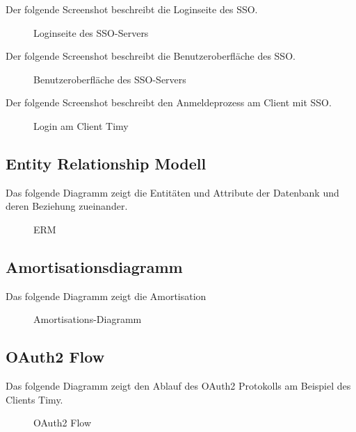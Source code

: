 Der folgende Screenshot beschreibt die Loginseite des \acs{SSO}.
\begin{figure}[htb]
\centering
{}
\caption{Loginseite des SSO-Servers}
\end{figure}
\clearpage

Der folgende Screenshot beschreibt die Benutzeroberfläche des \acs{SSO}.
\begin{figure}[htb]
\centering
{}
\caption{Benutzeroberfläche des SSO-Servers}
\end{figure}
\clearpage

Der folgende Screenshot beschreibt  den Anmeldeprozess am Client mit \acs{SSO}.
\begin{figure}[htb]
\centering
{}
\caption{Login am Client Timy}
\end{figure}
\clearpage

\subsection{Entity Relationship Modell}
\label{app:ERM}
Das folgende Diagramm zeigt die Entitäten und Attribute der Datenbank und deren Beziehung zueinander.
\begin{figure}[htb]
\centering
{}
\caption{ERM}
\end{figure}
\clearpage

\subsection{Amortisationsdiagramm}
\label{app:Amortisationsdiagramm}
Das folgende Diagramm zeigt die Amortisation
\begin{figure}[htb]
\centering
{}
\caption{Amortisations-Diagramm}
\end{figure}
\clearpage

\subsection{OAuth2 Flow}
\label{app:oauth2flow}
Das folgende Diagramm zeigt den Ablauf des OAuth2 Protokolls am Beispiel des Clients Timy.
\begin{figure}[htb]
\centering
{}
\caption{OAuth2 Flow}
\end{figure}
\clearpage

